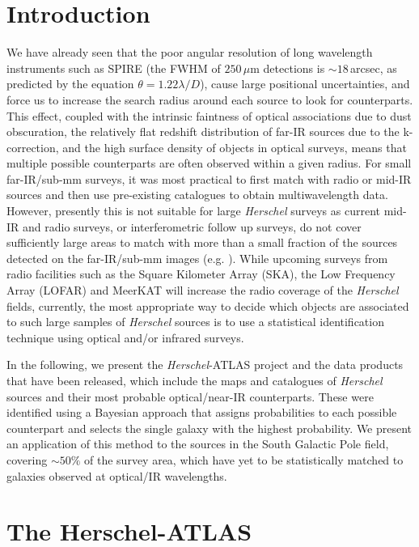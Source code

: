 \sloppy

\section{Introduction}

We have already seen that the poor angular resolution of long wavelength instruments such as SPIRE (the FWHM of $250\,\mu$m detections is $\sim18\,$arcsec, as predicted by the equation $\theta = 1.22\lambda/D$), cause large positional uncertainties, and force us to increase the search radius around each source to look for counterparts. This effect, coupled with the intrinsic faintness of optical associations due to dust obscuration, the relatively flat redshift distribution of far-IR sources due to the k-correction, and the high surface density of objects in optical surveys, means that multiple possible counterparts are often observed within a given radius. For small far-IR/sub-mm surveys, it was most practical to first match with radio or mid-IR sources and then use pre-existing catalogues to obtain multiwavelength data. However, presently this is not suitable for large \textit{Herschel} surveys as current mid-IR and radio surveys, or interferometric follow up surveys, do not cover sufficiently large areas to match with more than a small fraction of the sources detected on the far-IR/sub-mm images (e.g. \citealt{Chapman_2005, Ivison_2007, Dye_2008, Dye_2009, Biggs_2011, Simpson_2015}). While upcoming surveys from radio facilities such as the Square Kilometer Array (SKA), the Low Frequency Array (LOFAR) and MeerKAT will increase the radio coverage of the \textit{Herschel} fields, currently, the most appropriate way to decide which objects are associated to such large samples of \textit{Herschel} sources is to use a statistical identification technique using optical and/or infrared surveys.

In the following, we present the \textit{Herschel}-ATLAS project and the data products that have been released, which include the maps and catalogues of \textit{Herschel} sources and their most probable optical/near-IR counterparts. These were identified using a Bayesian approach that assigns probabilities to each possible counterpart and selects the single galaxy with the highest probability. We present an application of this method to the sources in the South Galactic Pole field, covering $\sim50\%$ of the survey area, which have yet to be statistically matched to galaxies observed at optical/IR wavelengths.

\section{The Herschel-ATLAS}
\label{sec:The Herschel-ATLAS}

